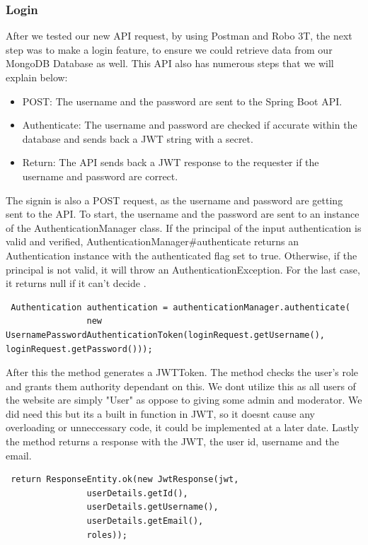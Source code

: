 \subsubsection{Login}
After we tested our new API request, by using Postman and Robo 3T, the next step was to make a login feature, to ensure we could retrieve data from our MongoDB Database as well. This API also has numerous steps that we will explain below: \par
\begin{itemize}
    \item POST: The username and the password are sent to the Spring Boot API.
    \item Authenticate: The username and password are checked if accurate within the database and sends back a JWT string with a secret.
    \item Return: The API sends back a JWT response to the requester if the username and password are correct.
\end{itemize}
The signin is also a POST request, as the username and password are getting sent to the API. To start, the username and the password are sent to an instance of the AuthenticationManager class. If the principal of the input authentication is valid and verified, AuthenticationManager#authenticate returns an Authentication instance with the authenticated flag set to true. Otherwise, if the principal is not valid, it will throw an AuthenticationException. For the last case, it returns null if it can't decide \cite{Baeldung}. \par
\begin{verbatim}
 Authentication authentication = authenticationManager.authenticate(
                new UsernamePasswordAuthenticationToken(loginRequest.getUsername(), loginRequest.getPassword())); 
\end{verbatim}
\par After this the method generates a JWTToken. The method checks the user's role and grants them authority dependant on this. We dont utilize this as all users of the website are simply "User" as oppose to giving some admin and moderator. We did need this but its a built in function in JWT, so it doesnt cause any overloading or unneccessary code, it could be implemented at a later date. Lastly the method returns a response with the JWT, the user id, username and the email.\par
\begin{verbatim}
 return ResponseEntity.ok(new JwtResponse(jwt,
                userDetails.getId(),
                userDetails.getUsername(),
                userDetails.getEmail(),
                roles));
\end{verbatim}

